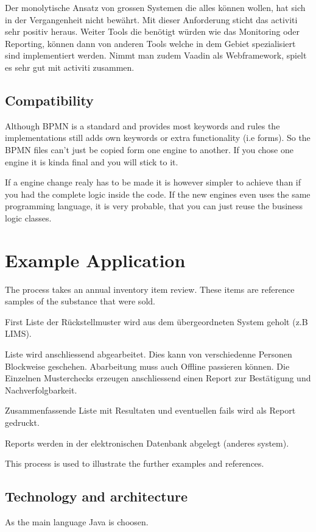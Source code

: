 \documentclass[paper=a4,twoside=false,BCOR=0mm,DIV=calc,fontsize=12pt]{scrartcl}
\begin{document}
Der monolytische Ansatz von grossen Systemen die alles können wollen, hat sich in der Vergangenheit nicht bewährt. Mit dieser Anforderung
sticht das activiti sehr positiv heraus. Weiter Tools die benötigt würden wie das Monitoring oder Reporting, können dann von anderen Tools
welche in dem Gebiet spezialisiert sind implementiert werden.
Nimmt man zudem Vaadin als Webframework, spielt es sehr gut mit activiti zusammen.


\subsection{Compatibility}
Although BPMN is a standard and provides most keywords and rules the implementations still adds own keywords or extra functionality (i.e
forms). So the BPMN files can't just be copied form one engine to another. If you chose one engine it is kinda final and you will stick to it.

If a engine change realy has to be made it is however simpler to achieve than if you had the complete logic inside the code. If the new engines even
uses the same programming language, it is very probable, that you can just reuse the business logic classes. 



\section{Example Application}
The process takes an annual inventory item review. These items are reference samples of the substance that were sold.


First 
Liste der Rückstellmuster wird aus dem übergeordneten System geholt (z.B LIMS). 

Liste wird anschliessend abgearbeitet. Dies kann von verschiedenne Personen Blockweise geschehen. Abarbeitung muss auch Offline passieren
können. Die Einzelnen Musterchecks erzeugen anschliessend einen Report zur Bestätigung und Nachverfolgbarkeit.

Zusammenfassende Liste mit Resultaten und eventuellen fails wird als Report gedruckt.

Reports werden in der elektronischen Datenbank abgelegt (anderes system). 



This process is used to illustrate the further examples and references.




\subsection{Technology and architecture}
As the main language Java is choosen.
\end{document}
